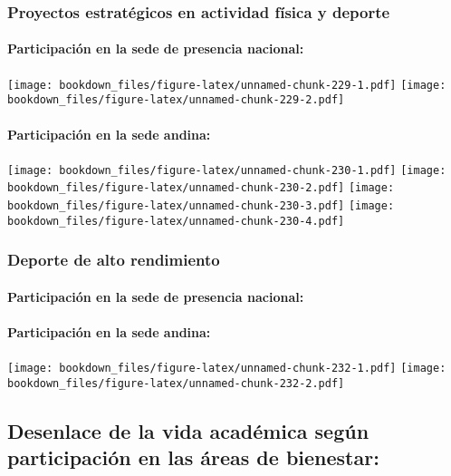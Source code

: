 \documentclass[]{article}
\let\oldparagraph\paragraph
\renewcommand{\paragraph}[1]{\oldparagraph{#1}\mbox{}}
\theoremstyle{definition}
\theoremstyle{definition}
\theoremstyle{definition}
\theoremstyle{remark}
\begin{document}
\subsubsection{Proyectos estratégicos en actividad física y
deporte}\label{proyectos-estrategicos-en-actividad-fisica-y-deporte-1}

\paragraph{Participación en la sede de presencia
nacional:}\label{participacion-en-la-sede-de-presencia-nacional-31}

\texttt{[image: bookdown\_files/figure-latex/unnamed-chunk-229-1.pdf]}
\texttt{[image: bookdown\_files/figure-latex/unnamed-chunk-229-2.pdf]}

\paragraph{Participación en la sede
andina:}\label{participacion-en-la-sede-andina-31}

\texttt{[image: bookdown\_files/figure-latex/unnamed-chunk-230-1.pdf]}
\texttt{[image: bookdown\_files/figure-latex/unnamed-chunk-230-2.pdf]}
\texttt{[image: bookdown\_files/figure-latex/unnamed-chunk-230-3.pdf]}
\texttt{[image: bookdown\_files/figure-latex/unnamed-chunk-230-4.pdf]}

\subsubsection{Deporte de alto
rendimiento}\label{deporte-de-alto-rendimiento-1}

\paragraph{Participación en la sede de presencia
nacional:}\label{participacion-en-la-sede-de-presencia-nacional-32}

\paragraph{Participación en la sede
andina:}\label{participacion-en-la-sede-andina-32}

\texttt{[image: bookdown\_files/figure-latex/unnamed-chunk-232-1.pdf]}
\texttt{[image: bookdown\_files/figure-latex/unnamed-chunk-232-2.pdf]}

\subsection{Desenlace de la vida académica según participación en las
áreas de
bienestar:}\label{desenlace-de-la-vida-academica-segun-participacion-en-las-areas-de-bienestar}
\end{document}
